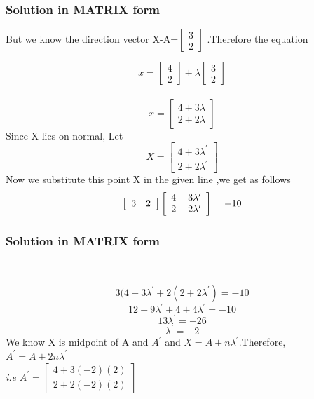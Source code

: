 \documentclass{beamer}
\begin{document}
\begin{frame}
\frametitle{Solution in MATRIX form}
But we know the direction vector X-A=$ \left[ 
  \begin{array}{ c  }
     3\\
     2
  \end{array} \right]$ .Therefore the equation 

\[
   x =\left[ 
  \begin{array}{ c  }
     4\\
     2
  \end{array} \right ]+ \lambda \left[ 
  \begin{array}{ c  }
     3 \\
     2 
  \end{array} \right]
  \]
 \\  
 \[
  x= \left[ 
  \begin{array}{ c }
     4+3\lambda\\
     2+2\lambda
  \end{array} \right]
  \]
  Since  X lies on normal, Let
\[
 X= 
\left[ 
  \begin{array}{ c  }
     4+3\lambda^{\prime}\\
     2+2\lambda^{\prime}
  \end{array} \right]
  \]
  Now we substitute this point X  in the given line ,we get as follows
  \[
  \left[ 
  \begin{array}{ c c }
     3 & 2
  \end{array}\right] \left[
  \begin{array}{c}
     4+3\lambda^{\prime}\\
     2+2\lambda^{\prime}
     \end{array}\right] = -10
\]     
     
     
  
  
\end{frame}


\begin{frame}
\frametitle{Solution in MATRIX form}\



 \[3(4+3\lambda^{\prime}+2(2+2\lambda^{\prime}) = -10\]
 \[12+9\lambda^{\prime}+4+4\lambda^{\prime} = -10\]
 \[ 13\lambda^{\prime}=-26\]
 \[\lambda^{\prime}=-2\]
 We know X is midpoint of A and $A^{\prime}$ and $X = A + n \lambda^{\prime}$.Therefore,\\
 
$A^{\prime} = A+ 2n \lambda^{\prime}$  \\ 
\textit{i.e}  $A^{\prime}= \left[ 
  \begin{array}{ c }
     4+3(-2)(2)\\
     2+2(-2)(2)
  \end{array} \right]$
   \end{frame}
\end{document}
